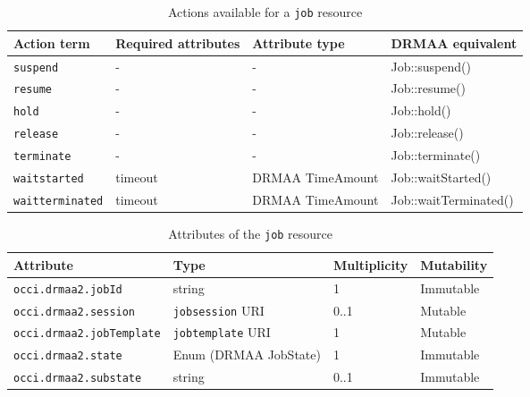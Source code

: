 \documentclass[10pt]{article}
\newcommand{\h}[1]{\lstinline|#1|}
\begin{document}
\begin{table}[ht]
\centering
\begin{tabularx}{\textwidth}{|X|X|X|X|}
\hline
Action term         & Required attributes & Attribute type    & DRMAA equivalent \\
\hline
\h{suspend}         & -                   &  -                & Job::suspend()  \\
\h{resume}          & -                   &  -                & Job::resume()   \\
\h{hold}            & -                   &  -                & Job::hold()     \\
\h{release}         & -                   &  -                & Job::release()  \\
\h{terminate}       & -                   &  -                & Job::terminate() \\
\h{waitstarted}     & timeout             & DRMAA TimeAmount  & Job::waitStarted() \\
\h{waitterminated}  & timeout             & DRMAA TimeAmount  & Job::waitTerminated()\\
\hline
\end{tabularx}
\caption{Actions available for a \h{job} resource}
\label{tab:jobactions}
\end{table}

\begin{table}[ht]
\centering
\begin{tabularx}{\textwidth}{|l|X|X|X|}
\hline
Attribute    & Type   & Multiplicity & Mutability \\
\hline
\h{occi.drmaa2.jobId}       & string              & 1            & Immutable \\ %
\h{occi.drmaa2.session}     & \h{jobsession} URI  & 0..1         & Mutable   \\ %
\h{occi.drmaa2.jobTemplate} & \h{jobtemplate} URI & 1            & Mutable   \\ %
\h{occi.drmaa2.state}       & Enum (DRMAA JobState)     & 1            & Immutable \\ %
\h{occi.drmaa2.substate}    & string              & 0..1         & Immutable \\ %
\hline
\end{tabularx}
\caption{Attributes of the \h{job} resource}
\label{tab:jobattributes}
\end{table}
\end{document}
